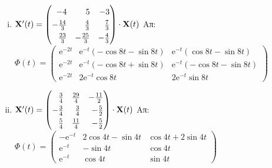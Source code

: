 \begin{enumerate}
\begin{enumerate}[i)]
      \item $ \mathbf{X}'(t) = 
          \renewcommand{\arraystretch}{1.3}
          \begin{pmatrix*}[r]
            -4 & 5 & -3 \\
            - \frac{14}{3} & \frac{4}{3} & \frac{7}{3}\\
            \frac{23}{3} & - \frac{25}{3} & - \frac{4}{3} 
          \end{pmatrix*} \cdot 
        \mathbf{X}(t) $
        \hfill Απ:  {\scriptsize $ \Phi(t) = 
        \begin{pmatrix*}
          \mathrm{e}^{-2t} & \mathrm{e}^{-t} (- \cos{8t} - \sin{8t}) & \mathrm{e}^{-t}
          (\cos{8t} - \sin{8t}) \\
          \mathrm{e}^{-2t} & \mathrm{e}^{-t} (- \cos{8t} + \sin{8t}) & \mathrm{e}^{-t}
          (- \cos{8t} - \sin{8t} ) \\
            \mathrm{e}^{-2t} & 2 \mathrm{e}^{-t} \cos{8t} & 2 \mathrm{e}^{-t}
            \sin{8t}
        \end{pmatrix*} $} 

      \item $ \mathbf{X}'(t) = 
          \renewcommand{\arraystretch}{1.3}
          \begin{pmatrix*}[r]
            \frac{3}{4} & \frac{29}{4}  & - \frac{11}{2} \\
            - \frac{3}{4} & \frac{3}{4} & - \frac{5}{2}\\
            \frac{5}{4} & \frac{11}{4} & - \frac{5}{2} 
          \end{pmatrix*} \cdot 
        \mathbf{X}(t) $
        \hfill Απ:  \scriptsize $ \Phi(t) = 
        \begin{pmatrix*}
          - \mathrm{e}^{-t} & 2 \cos{4t} - \sin{4t} & \cos{4t} + 2 \sin{4t} \\
          \mathrm{e}^{-t} & - \sin{4t} & \cos{4t} \\
          \mathrm{e}^{-t} & \cos{4t} & \sin{4t} 
        \end{pmatrix*} $ 
    \end{enumerate}


\end{enumerate}




